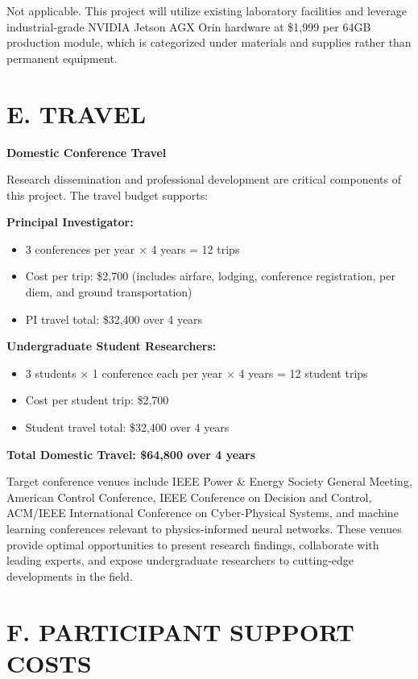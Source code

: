 \documentclass[12pt]{article}
\begin{document}
Not applicable. This project will utilize existing laboratory facilities and leverage industrial-grade NVIDIA Jetson AGX Orin hardware at \$1,999 per 64GB production module, which is categorized under materials and supplies rather than permanent equipment.

\section{E. TRAVEL}

\textbf{Domestic Conference Travel}

Research dissemination and professional development are critical components of this project. The travel budget supports:

\textbf{Principal Investigator:}
\begin{itemize}
    \item 3 conferences per year × 4 years = 12 trips
    \item Cost per trip: \$2,700 (includes airfare, lodging, conference registration, per diem, and ground transportation)
    \item PI travel total: \$32,400 over 4 years
\end{itemize}

\textbf{Undergraduate Student Researchers:}
\begin{itemize}
    \item 3 students × 1 conference each per year × 4 years = 12 student trips
    \item Cost per student trip: \$2,700
    \item Student travel total: \$32,400 over 4 years
\end{itemize}

\textbf{Total Domestic Travel: \$64,800 over 4 years}

Target conference venues include IEEE Power \& Energy Society General Meeting, American Control Conference, IEEE Conference on Decision and Control, ACM/IEEE International Conference on Cyber-Physical Systems, and machine learning conferences relevant to physics-informed neural networks. These venues provide optimal opportunities to present research findings, collaborate with leading experts, and expose undergraduate researchers to cutting-edge developments in the field.

\section{F. PARTICIPANT SUPPORT COSTS}
\end{document}
